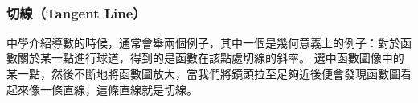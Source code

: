 \documentclass[11pt]{article}
\begin{document}
    \begin{center}
    \end{center}
    { \hspace*{\fill} \\}
    
    \hypertarget{ux5207ux7ddatangent-line}{%
\subsubsection{切線（Tangent Line）}\label{ux5207ux7ddatangent-line}}

中學介紹導數的時候，通常會舉兩個例子，其中一個是幾何意義上的例子：對於函數關於某一點進行球道，得到的是函數在該點處切線的斜率。
選中函數圖像中的某一點，然後不斷地將函數圖放大，當我們將鏡頭拉至足夠近後便會發現函數圖看起來像一條直線，這條直線就是切線。
\end{document}
